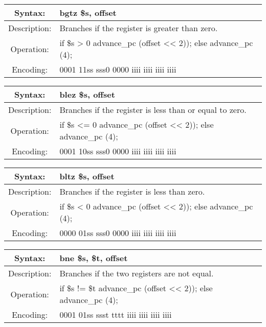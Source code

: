     \begin{table}[!hbp]
    \begin{tabularx}{\textwidth}{|c|X|}
        \hline
        Syntax: & bgtz \$s, offset \\
        \hline
        Description: & Branches if the register is greater than zero. \\
        \hline
        Operation: & if \$s > 0 advance\_pc (offset << 2)); else advance\_pc (4); \\
        \hline
        Encoding: & 0001 11ss sss0 0000 iiii iiii iiii iiii \\
        \hline
    \end{tabularx}
    \end{table}

    \begin{table}[!hbp]
    \begin{tabularx}{\textwidth}{|c|X|}
        \hline
        Syntax: & blez \$s, offset \\
        \hline
        Description: & Branches if the register is less than or equal to zero. \\
        \hline
        Operation: & if \$s <= 0 advance\_pc (offset << 2)); else advance\_pc (4); \\
        \hline
        Encoding: & 0001 10ss sss0 0000 iiii iiii iiii iiii \\
        \hline
    \end{tabularx}
    \end{table}

    \begin{table}[!hbp]
    \begin{tabularx}{\textwidth}{|c|X|}
        \hline
        Syntax: & bltz \$s, offset \\
        \hline
        Description: & Branches if the register is less than zero. \\
        \hline
        Operation: & if \$s < 0 advance\_pc (offset << 2)); else advance\_pc (4); \\
        \hline
        Encoding: & 0000 01ss sss0 0000 iiii iiii iiii iiii \\
        \hline
    \end{tabularx}
    \end{table}

    \begin{table}[!hbp]
    \begin{tabularx}{\textwidth}{|c|X|}
        \hline
        Syntax: & bne \$s, \$t, offset \\
        \hline
        Description: & Branches if the two registers are not equal. \\
        \hline
        Operation: & if \$s != \$t advance\_pc (offset << 2)); else advance\_pc (4); \\
        \hline
        Encoding: & 0001 01ss ssst tttt iiii iiii iiii iiii \\
        \hline
    \end{tabularx}
    \end{table}


